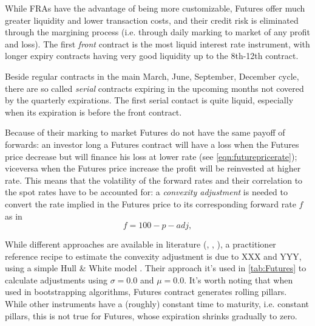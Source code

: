 \documentclass[11pt,reqno]{amsart}
\begin{document}
While FRAs have the advantage of being more customizable, Futures offer much greater liquidity and lower transaction costs, and their credit risk is eliminated through the margining process (i.e. through daily marking to market of any profit and loss). The first {\it front} contract is the most liquid interest rate instrument, with longer expiry contracts having very good liquidity up to the 8th-12th contract.

Beside regular contracts in the main March, June, September, December cycle, there are so called {\it serial} contracts expiring in the upcoming months not covered by the quarterly expirations. The first serial contact is quite liquid, especially when its expiration is before the front contract.

Because of their marking to market Futures do not have the same payoff of forwards: an investor long a Futures contract will have a loss when the Futures price decrease but will finance his loss at lower rate (see \ref{eqn:futurepricerate}); viceversa when the Futures price increase the profit will be reinvested at higher rate. This means that the volatility of the forward rates and their correlation to the spot rates have to be accounted for: a {\it convexity adjustment} is needed to convert the rate implied in the Futures price to its corresponding forward rate $f$ as in
\begin{equation}
f = 100 - p - adj,
\label{eqn:fwdfromfutureprice}
\end{equation}


\cite{}

While different approaches are available in literature (\cite{Jac05}, \cite{PitRen06}, \cite{Vaillant}), a practitioner reference recipe to estimate the convexity adjustment is due to  XXX and YYY, using a simple Hull \& White model \cite{HulWhi1990}. Their approach it's used in \ref{tab:Futures} to calculate adjustments using
$\sigma = 0.0$ and $\mu = 0.0$.
It's worth noting that when used in bootstrapping algorithms, Futures contract generates rolling pillars. While other instruments have a (roughly) constant time to maturity, i.e. constant pillars, this is not true for Futures, whose expiration shrinks gradually to zero.
\end{document}
